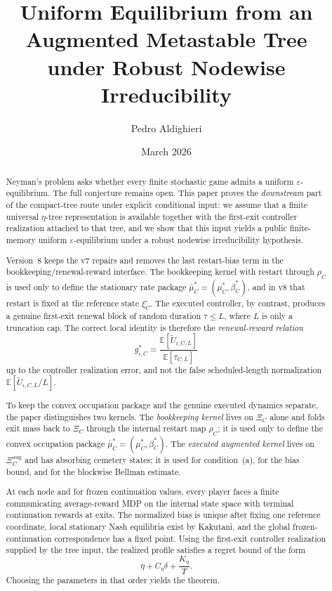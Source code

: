 \documentclass[12pt]{article}
\title{\textbf{Uniform Equilibrium from an Augmented Metastable Tree\\under Robust Nodewise Irreducibility}}
\author{Pedro Aldighieri}
\date{March 2026}
\theoremstyle{definition}
\newcommand{\eps}{\varepsilon}
\newcommand{\E}{\mathbb{E}}
\newcommand{\1}{\mathbf{1}}
\begin{document}
\maketitle



\begin{abstract}
Neyman's problem asks whether every finite stochastic game admits a uniform
$\eps$-equilibrium. The full conjecture remains open. This paper proves the
\emph{downstream} part of the compact-tree route under explicit conditional input:
we assume that a finite universal $\eta$-tree representation is available together
with the first-exit controller realization attached to that tree, and we show that
this input yields a public finite-memory uniform $\eps$-equilibrium under a robust
nodewise irreducibility hypothesis.

Version~8 keeps the v7 repairs and removes the last restart-bias term in
the bookkeeping/renewal-reward interface. The bookkeeping kernel with restart
through $\rho_C$ is used only to define the stationary rate package
$\bar\mu_C^*=(\mu_C^*,\beta_C^*)$, and in v8 that restart is fixed at the
reference state $\xi_C^\circ$. The executed controller, by contrast, produces a
genuine first-exit renewal block of random duration $\tau\le L$, where $L$ is
only a truncation cap. The correct local identity is therefore the
\emph{renewal-reward relation}
\[
g_{i,C}^*
=
\frac{\E[\widetilde U_{i,C,L}]}{\E[\tau_{C,L}]}
\]
up to the controller realization error, and not the false scheduled-length
normalization $\E[\widetilde U_{i,C,L}/L]$.

To keep the convex occupation package and the genuine executed dynamics separate,
the paper distinguishes two kernels. The \emph{bookkeeping kernel} lives on
$\Xi_C$ alone and folds exit mass back to $\Xi_C$ through the internal restart map
$\rho_C$; it is used only to define the convex occupation package
$\bar\mu_C^*=(\mu_C^*,\beta_C^*)$. The \emph{executed augmented kernel} lives on
$\Xi_C^{\mathrm{aug}}$ and has absorbing cemetery states; it is used for
condition~\textnormal{(a)}, for the bias bound, and for the blockwise Bellman
estimate.

At each node and for frozen continuation values, every player faces a finite
communicating average-reward MDP on the internal state space with terminal
continuation rewards at exits. The normalized bias is unique after fixing one
reference coordinate, local stationary Nash equilibria exist by Kakutani, and the
global frozen-continuation correspondence has a fixed point. Using the first-exit
controller realization supplied by the tree input, the realized profile satisfies a
regret bound of the form
\[
\eta + C_\eta\delta + \frac{K_\eta}{T}.
\]
Choosing the parameters in that order yields the theorem.
\end{abstract}
\end{document}
